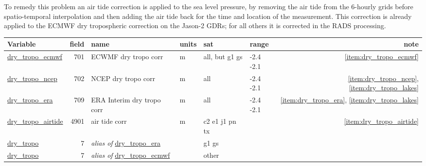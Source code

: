 \documentclass[a4paper,11pt,openany,natbib]{thesis}
\makeatletter
\newcommand\var[1]{\url{#1}\index{variables!#1@\protect\url{#1}}}
\newcommand\alias[1]{\emph{alias of} \var{#1}}
\newenvironment{vartable}{
\begin{table}[ht]
\small
\begin{tabular}{lrllllr}
\hline
Variable & field & name & units & sat & range & note \\
\hline
}{
\hline
\end{tabular}
\end{table}
}
\makeatother
\begin{document}
To remedy this problem an air tide correction is applied to the sea level pressure, by removing the air tide from the 6-hourly grids before spatio-temporal interpolation and then adding the air tide back for the time and location of the measurement. This correction is already applied to the ECMWF dry tropospheric correction on the Jason-2 GDRs; for all others it is corrected in the RADS processing.

\begin{vartable}
\var{dry_tropo_ecmwf} & 701 & ECWMF dry tropo corr & m & all, but g1 gs & -2.4 -2.1 & \ref{item:dry_tropo_ecmwf} \\
\var{dry_tropo_ncep}  & 702 & NCEP dry tropo corr  & m & all & -2.4 -2.1 & \ref{item:dry_tropo_ncep}, \ref{item:dry_tropo_lakes} \\
\var{dry_tropo_era}   & 709 & ERA Interim dry tropo corr   & m & all & -2.4 -2.1 & \ref{item:dry_tropo_era}, \ref{item:dry_tropo_lakes} \\
\var{dry_tropo_airtide} & 4901 & air tide corr     & m & c2 e1 j1 pn tx & & \ref{item:dry_tropo_airtide} \\
\hline
\var{dry_tropo}       &   7 & \alias{dry_tropo_era} && g1 gs && \\
\var{dry_tropo}       &   7 & \alias{dry_tropo_ecmwf} && other && \\
\end{vartable}
\end{document}
